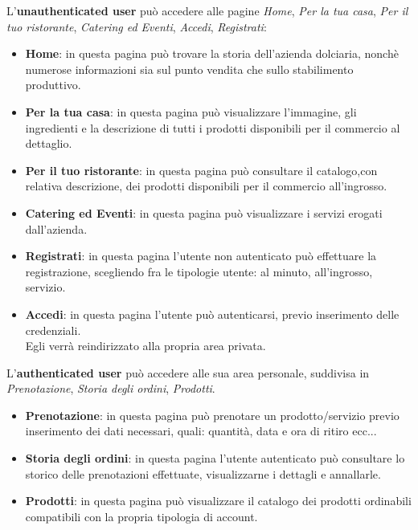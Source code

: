 L'\textbf{unauthenticated user} può accedere alle pagine \textit{Home}, \textit{Per la tua casa}, \textit{Per il tuo ristorante}, \textit{Catering ed Eventi}, \textit{Accedi}, \textit{Registrati}:
\begin{itemize}
	\item \textbf{Home}: in questa pagina può trovare la storia dell'azienda dolciaria, nonchè numerose informazioni sia sul punto vendita che sullo stabilimento produttivo.

	\item \textbf{Per la tua casa}: in questa pagina può visualizzare l'immagine, gli ingredienti e la descrizione di tutti i prodotti disponibili per il commercio al dettaglio.

	\item \textbf{Per il tuo ristorante}: in questa pagina può consultare il catalogo,con relativa descrizione, dei prodotti disponibili per il commercio all'ingrosso.

	\item \textbf{Catering ed Eventi}: in questa pagina può visualizzare i servizi erogati dall'azienda.

	\item \textbf{Registrati}: in questa pagina l'utente non autenticato può effettuare la registrazione, scegliendo fra le tipologie utente: al minuto, all'ingrosso, servizio.

	\item \textbf{Accedi}: in questa pagina l'utente può autenticarsi, previo inserimento delle credenziali.\\
	Egli verrà reindirizzato alla propria area privata.
\end{itemize}

L'\textbf{authenticated user} può accedere alle sua area personale, suddivisa in \textit{Prenotazione}, \textit{Storia degli ordini}, \textit{Prodotti}.

\begin{itemize}
	\item \textbf{Prenotazione}: in questa pagina può prenotare un prodotto/servizio previo inserimento dei dati necessari, quali: quantità, data e ora di ritiro ecc...

	\item \textbf{Storia degli ordini}: in questa pagina l'utente autenticato può consultare lo storico delle prenotazioni effettuate, visualizzarne i dettagli e annallarle.

	\item \textbf{Prodotti}: in questa pagina può visualizzare il catalogo dei prodotti ordinabili compatibili con la propria tipologia di account.
\end{itemize}

